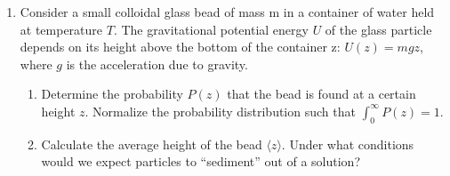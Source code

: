 \begin{enumerate}
    \pagebreak

  \item Consider a small colloidal glass bead of mass m in a
    container of water held at temperature $T$. The
    gravitational potential energy $U$ of the glass particle depends
    on its height above the bottom of the
    container z: $U(z) = mgz$, where $g$ is the acceleration due to gravity.

    \begin{enumerate}
      \item Determine the probability $P(z)$ that the bead is found
        at a certain height $z$. Normalize the
        probability distribution such that $\int_0^\infty P(z) = 1$.


      \item Calculate the average height of the bead $\langle
        z\rangle$. Under what conditions would we expect particles
        to “sediment” out of a solution?

\end{enumerate}
\end{enumerate}
